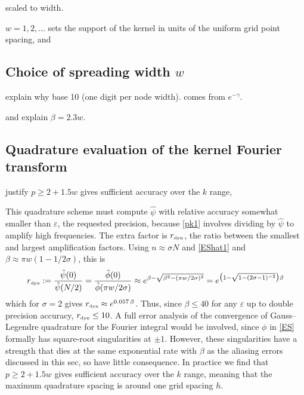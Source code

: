 \documentclass[10pt]{article}
\newcommand{\be}{\begin{equation}}
\newcommand{\ee}{\end{equation}}
\newcommand{\tbox}[1]{{\mbox{\tiny #1}}}
\newcommand{\eps}{\varepsilon}
\newcommand{\freq}{\beta}          %
\newcommand{\rat}{\sigma}          %
\newcommand{\rmax}{r_\tbox{dyn}}    %
\begin{document}
scaled to width.

$w=1,2,\ldots$
sets the support of the kernel in units of the uniform grid point spacing, and






\subsection{Choice of spreading width $w$}
\label{s:w}

explain why base 10 (one digit per node width).
comes from $e^{-\gamma}$.

and explain $\beta = 2.3 w$.


\subsection{Quadrature evaluation of the kernel Fourier transform}
\label{s:p}

justify  $p\ge 2+1.5 w$ gives sufficient accuracy
over the $k$ range,

This quadrature scheme must compute $\hat\psi$
with relative accuracy
somewhat smaller than $\eps$, the requested precision,
because \eqref{pk1} involves dividing by $\hat\psi$ to amplify
high frequencies.
The extra factor is $\rmax$, the ratio between the smallest and largest
amplification factors. Using $n\approx \rat N$ and
\eqref{EShat1} and $\beta \approx \pi w( 1- 1/2\rat)$,
this is
\be
\rmax := \frac{\hat\psi(0)}{\hat\psi(N/2)}
= \frac{\hat\phi(0)}{\hat\phi(\pi w/2\rat)}
\approx e^{\freq - \sqrt{\freq^2 - (\pi w/2\rat)^2}}
= e^{\bigl(1 - \sqrt{1-(2\rat-1)^{-2}}\bigr)\freq}
\label{rmax}
\ee
which for $\rat=2$ gives $\rmax \approx e^{0.057\,\freq}$.
Thus, since $\beta\le40$ for any $\eps$
up to double precision accuracy, $\rmax\le 10$.
A full error analysis of the convergence of Gauss--Legendre quadrature
for the Fourier integral would be involved, since $\phi$ in \eqref{ES}
formally has square-root singularities at $\pm 1$.
However, these singularities have a strength that dies at the same
exponential rate with $\freq$
as the aliasing errors discussed in this sec, so have
little consequence.
In practice we find that $p\ge 2+1.5 w$ gives sufficient accuracy
over the $k$ range,
meaning that the maximum quadrature spacing is around one
grid spacing $h$.
\end{document}

